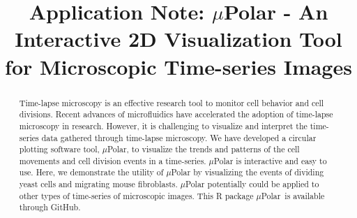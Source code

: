 \documentclass[conference]{IEEEtran}
\begin{document}
\title{ Application Note: $\mu$Polar \-- An Interactive 2D Visualization Tool for Microscopic Time-series Images }

 \author{
 \and
{}
 }

\maketitle
\begin{abstract}
Time-lapse  microscopy is an effective research tool to monitor cell behavior and cell divisions. Recent advances of microfluidics have accelerated the adoption of time-lapse microscopy in research. However, it is challenging to visualize and interpret the time-series data gathered through time-lapse microscopy. We have developed a circular plotting software tool, $\mu$Polar, to visualize the trends and patterns of the cell movements and cell division events in a time-series. $\mu$Polar is interactive and easy to use. Here, we demonstrate the utility of $\mu$Polar by visualizing the events of dividing yeast cells and migrating mouse fibroblasts. $\mu$Polar potentially could be applied to other types of time-series of microscopic images. This R package $\mu$Polar\ is available through GitHub.
\end{abstract}
\end{document}
